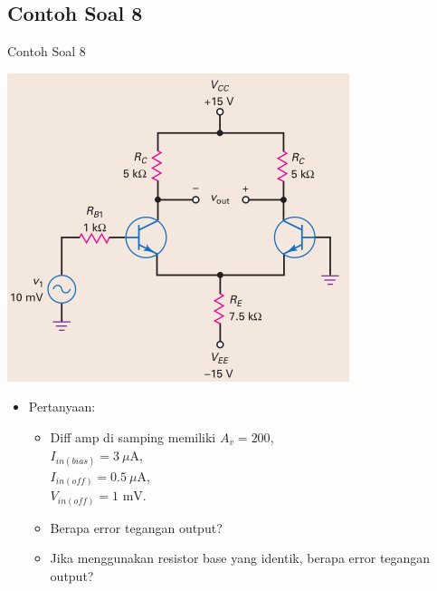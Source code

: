\documentclass[aspectratio=169]{beamer}
\begin{document}
\subsection{Contoh Soal 8}
\begin{frame}{Contoh Soal 8}
	\begin{multicols}{2}
		\begin{center}
			\includegraphics[height=0.7\textheight]{gambar/01.diff-amp/01.latihan_soal_8}
		\end{center}
		\columnbreak
		\begin{itemize}
			\item Pertanyaan:
			\begin{itemize}
				\item Diff amp di samping memiliki $ A_v = 200 $,\\ $ I_{in(bias)} = 3~\mu\text{A} $, \\ $ I_{in(off)} = 0.5~\mu\text{A} $, \\ $ V_{in(off)} = 1 \text{ mV}$.  
				\item Berapa error tegangan output?
				\item Jika menggunakan resistor base yang identik, berapa error tegangan output?
			\end{itemize}
		\end{itemize}
	\end{multicols}
\end{frame}
\end{document}
